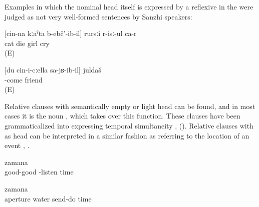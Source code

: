 Examples in which the nominal head itself is expressed by a reflexive in the  were judged as not very well-formed sentences by Sanzhi speakers:
%
\begin{exe}
	\ex	\label{ex:The girl whose cat died is crying}
		[cin-na	kːaˁta	b-ebč'-ib-il]	rursːi	r-isː-ul	ca-r\\
		{}		cat	die	girl	cry	\\
	\glt	{} (E)

	\ex	\label{ex:The friend with whom I came goes to Derbent tomorrow}
		[du	cin-i-cːella	sa-jʁ-ib-il]	juldaš	\\
		{}			-come	friend	\\
	\glt	{} (E)
\end{exe}

Relative clauses with semantically empty or light head  can be found, and in most cases it is the noun , which takes over this function. These clauses have been grammaticalized into  expressing temporal simultaneity ,  (). Relative clauses with   as head can be interpreted in a similar fashion as  referring to the location of an event , .
%
\begin{exe}
	\ex	\label{ex:at the time (when they) were listening carefully}
		zamana\\
		good-good	-listen	time\\
	\glt	{}

	\ex	\label{ex:at the time (when) you send the water from the aperture}
		zamana\\
		aperture		water	send-do	time\\
	\glt	{}
\end{exe}

